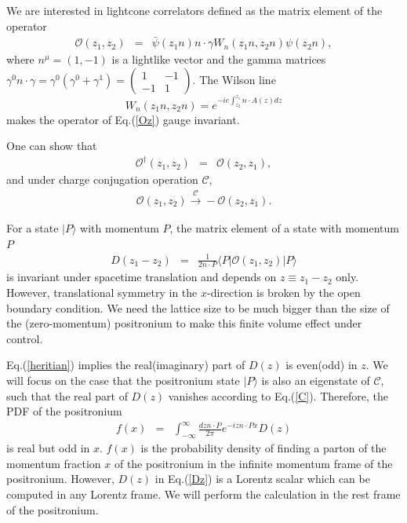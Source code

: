 \documentclass[aps,prd,twocolumn,tightenlines,superscriptaddress,
nofootinbib,preprintnumbers]{revtex4-1}
\begin{document}
We are interested in lightcone correlators defined as the matrix element of the operator 
\begin{eqnarray}
\label{Oz}
\mathcal{O}(z_1,z_2)&=&  \bar{\psi}(z_1 n) n\cdot \gamma W_n(z_1 n,z_2 n)\psi(z_2 n) ,
\end{eqnarray}
where $n^{\mu}=(1,-1)$ is a lightlike vector and the gamma matrices $\gamma^0 n\cdot \gamma=\gamma^0(\gamma^0+\gamma^1)=\begin{pmatrix}
1 &-1 \\
-1 &1
\end{pmatrix}$. The Wilson line
\begin{equation} 
W_n(z_1 n,z_2 n)=%
e^{-ie\int^{z_1}_{z_2} n \cdot A(z)d z}
\end{equation}
makes the operator of Eq.(\ref{Oz}) gauge invariant.

One can show that
\begin{eqnarray}
\label{heritian}
\mathcal{O}^{\dagger}(z_1,z_2)
&=& \mathcal{O}(z_2,z_1) ,
\end{eqnarray}
and under charge conjugation operation $\mathcal{C}$, 
\begin{eqnarray}
\label{C}
   \mathcal{O}(z_1,z_2) \overset{\mathcal{C}}{\to} -\mathcal{O}(z_2,z_1).
\end{eqnarray}

For a state $|P \rangle$ with momentum $P$, the matrix element of a state with momentum $P$
\begin{eqnarray}
\label{Dz}
   D(z_1-z_2) 
    &=& \frac{1}{2 n\cdot P}\langle P|\mathcal{O}(z_1,z_2)|P \rangle 
\end{eqnarray}
is invariant under spacetime translation and depends on $z\equiv z_1-z_2$ only. 
However, translational symmetry in the $x$-direction is broken by the open boundary condition. We need the lattice size to be much bigger than the size of the (zero-momentum) positronium to make this finite volume effect under control. 

Eq.(\ref{heritian}) implies the real(imaginary) part of $D(z)$ is even(odd) in $z$. We will focus on the case that the positronium state $|P \rangle$ is also an eigenstate of $\mathcal{C}$, such that
the real part of $D(z)$ vanishes according to Eq.(\ref{C}). Therefore, the PDF of the positronium
\begin{eqnarray}
\label{f(x)}
f(x)&=& \int_{-\infty}^{\infty} \frac{dz n\cdot P}{2 \pi} e^{-i z n\cdot P x} D(z) 
\end{eqnarray}
is real but odd in $x$. $f(x)$ is the probability density of finding a parton of the momentum fraction $x$ of the positronium in the infinite momentum frame of the positronium. However, $D(z)$ in Eq.(\ref{Dz}) is a Lorentz scalar which can be computed in any Lorentz frame. We will perform the calculation in the rest frame of the positronium.  
\end{document}
